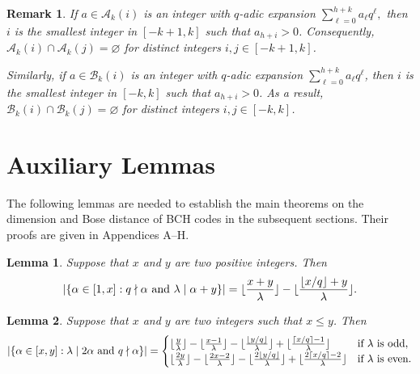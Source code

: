 \documentclass[journal,onecolumn]{IEEEtran}
\newtheorem{lemma}{Lemma}
\newtheorem{Remark}{Remark}
\begin{document}
\begin{Remark}\label{cor2} 
If   $a\in \mathcal{A}_k(i)$ is an integer with  $q$-adic expansion $\sum\limits_{\ell=0}^{h+k}a_{\ell}q^{\ell},$ then 
$i$ is the smallest integer in $[-k+1,k]$ such that $a_{h+i}>0$.  Consequently, $\mathcal{A}_k(i)\cap \mathcal{A}_k(j)=\varnothing$  for  distinct integers $i,j\in [-k+1,k]$. 

Similarly,  if $a\in \mathcal{B}_k(i)$ is an integer with  $q$-adic expansion $\sum\limits_{\ell=0}^{h+k}a_{\ell}q^{\ell}$,  then   $i$ is the smallest integer in $[-k,k]$ such that $a_{h+i}>0$.  As a result,  $\mathcal{B}_k(i)\cap \mathcal{B}_{k}(j)=\varnothing$ for distinct integers $i,j\in [-k,k]$. 
\end{Remark}





\section{Auxiliary Lemmas}\label{aux}
The following lemmas are needed to establish the main theorems on the dimension and Bose distance of BCH codes in the subsequent sections. Their proofs are given in Appendices A–H.
\begin{lemma}\label{le1}Suppose that  $x$ and $y$ are two positive integers. Then  
   \begin{equation}\notag
       \left|\{\alpha\in [1,x]: q\nmid \alpha \hbox{ and }\lambda\mid \alpha+y \}\right|=\lfloor \frac{x+y}{\lambda}\rfloor -\lfloor\frac{\lfloor {x}/{q}\rfloor+y}{\lambda} \rfloor.
    \end{equation}
\end{lemma}

\begin{lemma}\label{lll8} 
Suppose that  $x$ and $y$ are two integers such that  $x\leq y$. Then  
\begin{equation}\notag
\left| \{\alpha\in [x,y]:\lambda\mid 2\alpha\hbox{ and }q\nmid \alpha \}\right|= \begin{cases}
\lfloor\frac{y}{\lambda}\rfloor -\lfloor\frac{x-1}{\lambda} \rfloor -  \lfloor \frac{\lfloor y/q\rfloor}{\lambda}\rfloor+\lfloor \frac{\lceil {x}/{q} \rceil-1}{\lambda} \rfloor&\hbox{if $\lambda$ is odd,}\\
 \lfloor\frac{2y}{\lambda}\rfloor -\lfloor\frac{2x-2}{\lambda} \rfloor -  \lfloor \frac{2\lfloor y/q\rfloor}{\lambda}\rfloor+\lfloor \frac{2\lceil {x}/{q} \rceil-2}{\lambda} \rfloor&\hbox{if $ \lambda$ is even.}     
\end{cases}
\end{equation}
\end{lemma}
\end{document}
